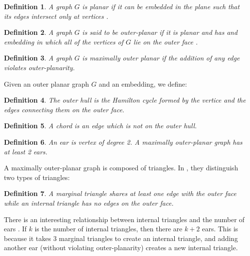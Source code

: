 \documentclass[letterpaper, 10pt]{article}
\begin{document}
\newtheorem{definition}{Definition}
\newtheorem{theorem}{Theorem}
\newtheorem{proposition}{Proposition}
\newtheorem{corollary}{Corollary}
\newtheorem{lemma}{Lemma}

\begin{definition}
A graph $G$ is \emph{planar} if it can be embedded in the plane such that its edges
intersect only at vertices \cite{bondy2008graph}.
\end{definition}

\begin{definition}
A graph $G$ is said to be \emph{outer-planar} if it is planar and has and embedding
in which all of the vertices of $G$ lie on the outer face \cite{campos2013dominating}.
\end{definition}

\begin{definition}
A graph $G$ is \emph{maximally outer planar} if the addition of any edge violates
 outer-planarity.
\end{definition}

Given an outer planar graph $G$ and an embedding, we define:

\begin{definition}
The \emph{outer hull} is the Hamilton cycle formed by the vertice and the edges
connecting them on the outer face.
\end{definition}

\begin{definition}
A \emph{chord} is an edge which is not on the outer hull.
\end{definition}

\begin{definition}
An \emph{ear} is vertex of degree 2. A maximally outer-planar graph has at least 2 ears.
\end{definition}

A maximally outer-planar graph is composed of triangles. In \cite{campos2013dominating},
they distinguish two types of triangles:

\begin{definition}
A \emph{marginal} triangle shares at least one edge with the outer face while
 an \emph{internal} triangle has no edges on the outer face.
\end{definition}

There is an interesting relationship between internal triangles and the number
of ears \cite{campos2013dominating}. If $k$ is the number of internal triangles, then there are $k+2$ ears.
This is because it takes 3 marginal triangles to create an internal triangle, and
adding another ear (without violating outer-planarity) creates a new internal triangle.
\end{document}
